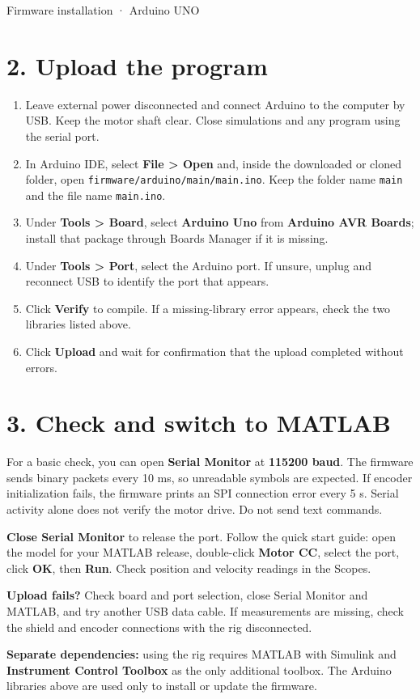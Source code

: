 \documentclass[11pt,a4paper]{article}
\begin{document}
\clearpage
{\small\color{isa} Firmware installation · Arduino UNO}\par
\section*{2. Upload the program}
\begin{enumerate}
\item Leave external power disconnected and connect Arduino to the computer by USB. Keep the motor shaft clear. Close simulations and any program using the serial port.
\item In Arduino IDE, select \textbf{File > Open} and, inside the downloaded or cloned folder, open \texttt{firmware/arduino/main/main.ino}. Keep the folder name \texttt{main} and the file name \texttt{main.ino}.
\item Under \textbf{Tools > Board}, select \textbf{Arduino Uno} from \textbf{Arduino AVR Boards}; install that package through Boards Manager if it is missing.
\item Under \textbf{Tools > Port}, select the Arduino port. If unsure, unplug and reconnect USB to identify the port that appears.
\item Click \textbf{Verify} to compile. If a missing-library error appears, check the two libraries listed above.
\item Click \textbf{Upload} and wait for confirmation that the upload completed without errors.
\end{enumerate}

\section*{3. Check and switch to MATLAB}
For a basic check, you can open \textbf{Serial Monitor} at \textbf{115200 baud}. The firmware sends binary packets every 10 ms, so unreadable symbols are expected. If encoder initialization fails, the firmware prints an SPI connection error every 5 s. Serial activity alone does not verify the motor drive. Do not send text commands.

\textbf{Close Serial Monitor} to release the port. Follow the quick start guide: open the model for your MATLAB release, double-click \textbf{Motor CC}, select the port, click \textbf{OK}, then \textbf{Run}. Check position and velocity readings in the Scopes.

\textbf{Upload fails?} Check board and port selection, close Serial Monitor and MATLAB, and try another USB data cable. If measurements are missing, check the shield and encoder connections with the rig disconnected.

\textbf{Separate dependencies:} using the rig requires MATLAB with Simulink and \textbf{Instrument Control Toolbox} as the only additional toolbox. The Arduino libraries above are used only to install or update the firmware.
\end{document}

